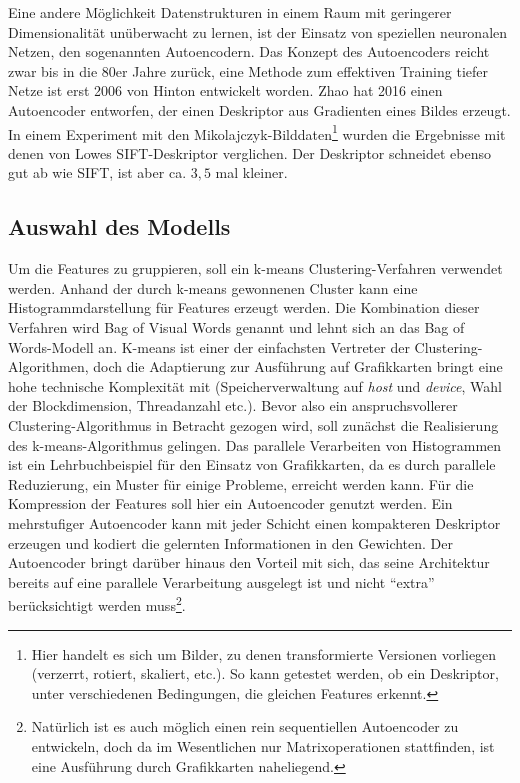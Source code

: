 Eine andere Möglichkeit Datenstrukturen in einem Raum mit geringerer Dimensionalität unüberwacht zu lernen, ist der Einsatz von speziellen neuronalen Netzen, den sogenannten Autoencodern. Das Konzept des Autoencoders reicht zwar bis in die 80er Jahre zurück, eine Methode zum effektiven Training tiefer Netze ist erst 2006 von Hinton \cite{dae2006} entwickelt worden. Zhao \cite{aed2016} hat 2016 einen Autoencoder entworfen, der einen Deskriptor aus Gradienten eines Bildes erzeugt. In einem Experiment mit den Mikolajczyk-Bilddaten\footnote{Hier handelt es sich um Bilder, zu denen transformierte Versionen vorliegen (verzerrt, rotiert, skaliert, etc.). So kann getestet werden, ob ein Deskriptor, unter verschiedenen Bedingungen, die gleichen Features erkennt.} wurden die Ergebnisse mit denen von Lowes SIFT-Deskriptor verglichen. Der Deskriptor schneidet ebenso gut ab wie SIFT, ist aber ca. $3,5$ mal kleiner.

\subsection{Auswahl des Modells}

Um die Features zu gruppieren, soll ein k-means Clustering-Verfahren verwendet werden. Anhand der durch k-means gewonnenen Cluster kann eine Histogrammdarstellung für Features erzeugt werden. Die Kombination dieser Verfahren wird Bag of Visual Words genannt und lehnt sich an das Bag of Words-Modell an. K-means ist einer der einfachsten Vertreter der Clustering-Algorithmen, doch die Adaptierung zur Ausführung auf Grafikkarten bringt eine hohe technische Komplexität mit (Speicherverwaltung auf \textit{host} und \textit{device}, Wahl der Blockdimension, Threadanzahl etc.). Bevor also ein anspruchsvollerer Clustering-Algorithmus in Betracht gezogen wird, soll zunächst die Realisierung des k-means-Algorithmus gelingen. Das parallele Verarbeiten von Histogrammen ist ein Lehrbuchbeispiel für den Einsatz von Grafikkarten, da es durch parallele Reduzierung, ein Muster für einige Probleme, erreicht werden kann. \newline
Für die Kompression der Features soll hier ein Autoencoder genutzt werden. Ein mehrstufiger Autoencoder kann mit jeder Schicht einen kompakteren Deskriptor erzeugen und kodiert die gelernten Informationen in den Gewichten. Der Autoencoder bringt darüber hinaus den Vorteil mit sich, das seine Architektur bereits auf eine parallele Verarbeitung ausgelegt ist und nicht \enquote{extra} berücksichtigt werden muss\footnote{Natürlich ist es auch möglich einen rein sequentiellen Autoencoder zu entwickeln, doch da im Wesentlichen nur Matrixoperationen stattfinden, ist eine Ausführung durch Grafikkarten naheliegend.}.

